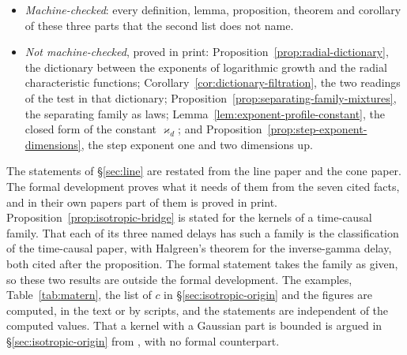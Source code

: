 \begin{itemize}
\item \emph{Machine-checked}: every definition, lemma, proposition, theorem and corollary of
these three parts that the second list does not name.
\item \emph{Not machine-checked}, proved in print:
Proposition~\ref{prop:radial-dictionary}, the dictionary between the exponents of logarithmic
growth and the radial characteristic functions;
Corollary~\ref{cor:dictionary-filtration}, the two readings of the test in that dictionary;
Proposition~\ref{prop:separating-family-mixtures}, the separating family as laws;
Lemma~\ref{lem:exponent-profile-constant}, the closed form of the constant $\varkappa_d$;
and Proposition~\ref{prop:step-exponent-dimensions}, the step exponent one and two dimensions up.
\end{itemize}
The statements of \S\ref{sec:line} are restated from the line paper and the cone paper. The
formal development proves what it needs of them from the seven cited facts, and in their own
papers part of them is proved in print. Proposition~\ref{prop:isotropic-bridge} is stated for
the kernels of a time-causal family. That each of its three named delays has such a family is
the classification of the time-causal paper, with Halgreen's theorem for the inverse-gamma
delay, both cited after the proposition. The formal statement takes the family as given, so
these two results are outside the formal development. The examples, Table~\ref{tab:matern},
the list of $c$ in \S\ref{sec:isotropic-origin} and the figures are computed, in the text or by
scripts, and the statements are independent of the computed values. That a kernel with a
Gaussian part is bounded is argued in \S\ref{sec:isotropic-origin} from , with no
formal counterpart.
